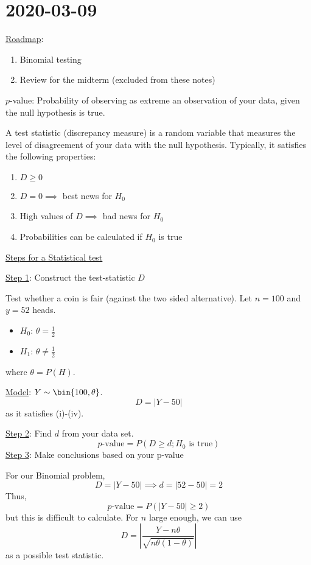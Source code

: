 \section{2020-03-09}
\underline{Roadmap}:
\begin{enumerate}[label=(\roman*)]
    \item Binomial testing
    \item Review for the midterm (excluded from these notes)
\end{enumerate}

\begin{Definition}{}{}
    $ p $-value: Probability of observing as extreme an observation of your data,
    given the null hypothesis is true.
\end{Definition}



\begin{Definition}{}{}
    A test statistic (discrepancy measure) is a random variable that measures
    the level of disagreement of your data with the null hypothesis. Typically,
    it satisfies the following properties:
    \begin{enumerate}[label=(\roman*)]
        \item $ D\geqslant 0 $
        \item $ D=0 \implies $ best news for $ H_0 $
        \item High values of $ D \implies $ bad news for $ H_0 $
        \item Probabilities can be calculated if $ H_0 $ is true
    \end{enumerate}
\end{Definition}


\underline{Steps for a Statistical test}

\underline{Step 1}: Construct the test-statistic $ D $

\begin{Example}{}{}
    Test whether a coin is fair (against the two sided alternative).
    Let $ n=100 $ and $ y=52 $ heads.
    \begin{itemize}
        \item $ H_0 $: $ \theta=\frac{1}{2} $
        \item $ H_1 $: $ \theta\neq \frac{1}{2} $
    \end{itemize}
    where $ \theta=P(H) $.

    \underline{Model}: $ Y \sim \bin{100,\theta} $.
    \[ D=|Y-50| \]
    as it satisfies (i)-(iv).
\end{Example}

\underline{Step 2}: Find $ d $ from your data set.
\[ p\text{-value}=P(D\geqslant d;H_0\text{ is true}) \]
\underline{Step 3}: Make conclusions based on your p-value

For our Binomial problem,
\[ D=|Y-50|\implies d=|52-50|=2 \]
Thus,
\[ p\text{-value}=P(|Y-50|\geqslant 2) \]
but this is difficult to calculate. For $ n $ large enough, we can use
\[ D=\left| \frac{Y-n\theta}{\sqrt{n\theta(1-\theta)}} \right| \]
as a possible test statistic.
